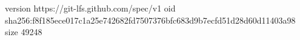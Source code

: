 version https://git-lfs.github.com/spec/v1
oid sha256:f8f185ece017c1a25e742682fd7507376bfc683d9b7ecfd51d28d60d11403a98
size 49248
